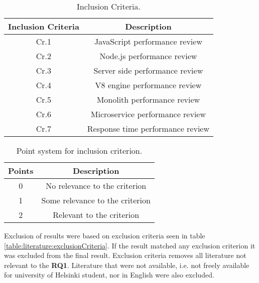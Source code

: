 \begin{table}[ht!]
    \begin{tabular}{|c c|} 
        \hline
        Inclusion Criteria 
        & Description \\ [0.5ex] 
        \hline\hline
        Cr.1
        & JavaScript performance review
        \\ 
        
        Cr.2
        & Node.js performance review  \\ 
        
        Cr.3
        & Server side performance review  \\ 
        
        Cr.4
        & V8 engine performance review  \\ 
        
        Cr.5
        & Monolith performance review  \\ 
        
        Cr.6
        & Microservice performance review  \\ 
        
        Cr.7
        & Response time performance review  \\ 
        \hline
    \end{tabular}    
    \caption{Inclusion Criteria.}
    \label{table:literature:inclusionCriteria}
\end{table}

\begin{table}[ht!]
    \begin{tabular}{|c c|}
        \hline
        Points & Description \\ [0.5ex] 
        \hline\hline
         0 & No relevance to the criterion  \\ 
        
        1 & Some relevance to the criterion \\ 
        
        2 & Relevant to the criterion \\ 
        \hline
    \end{tabular}
    \caption{Point system for inclusion criterion.}
    \label{table:literature:pointSystem}
\end{table}

Exclusion of results were based on exclusion criteria seen in table \ref{table:literature:exclusionCriteria}.
If the result matched any exclusion criterion it was excluded from the final result.
Exclusion criteria removes all literature not relevant to the \textbf{RQ1}.
Literature that were not available, i.e. not freely available for university of Helsinki student, nor in English were also excluded.

